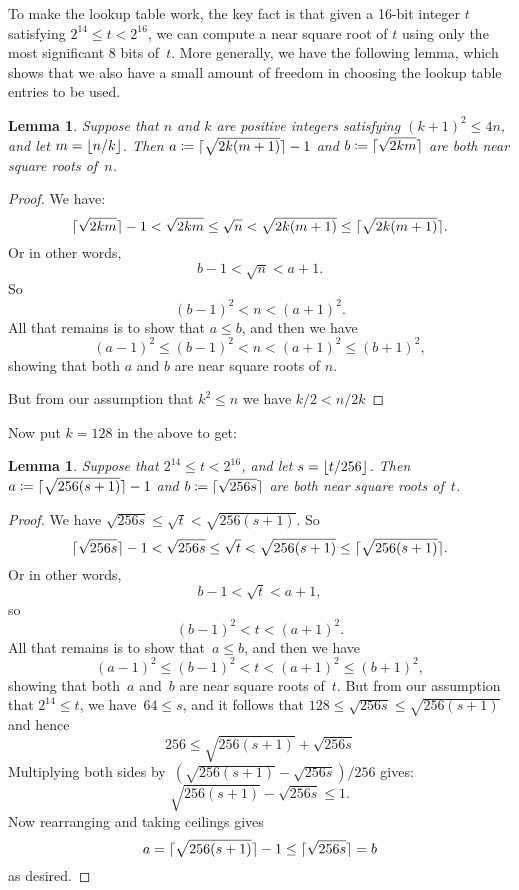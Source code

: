 \documentclass[a4paper]{article}
\DeclarePairedDelimiter\floor{\lfloor}{\rfloor}
\DeclarePairedDelimiter\ceil{\lceil}{\rceil}
\newcommand{\csqrt}[1]{\ceil{\sqrt{#1}}}
\theoremstyle{plain}
\newtheorem{lemma}[theorem]{Lemma}
\theoremstyle{definition}
\begin{document}
To make the lookup table work, the key fact is that given a 16-bit integer $t$
satisfying $2^{14} \le t < 2^{16}$, we can compute a near square root of $t$
using only the most significant 8 bits of~$t$. More generally, we have the
following lemma, which shows that we also have a small amount of freedom in
choosing the lookup table entries to be used.

\begin{lemma} Suppose that $n$ and $k$ are positive integers satisfying
  $(k+1)^2 \le 4n$, and let $m = \floor{n / k}$.
  Then $a \coloneqq \csqrt{2k(m+1)} - 1$ and $b \coloneqq \csqrt{2km}$
  are both near square roots of~$n$.
\end{lemma}

\begin{proof}
  We have:
    $$\csqrt{2km} - 1
      < \sqrt{2km}
      \le \sqrt n
      < \sqrt{2k(m+1)}
      \le \csqrt{2k(m+1)}.$$
  Or in other words,
    $$b - 1 < \sqrt n < a + 1.$$
  So
    $$(b - 1)^2 < n < (a + 1)^2.$$
  All that remains is to show that $a \le b$, and then we have
    $$(a - 1)^2 \le (b - 1)^2 < n < (a + 1)^2 \le (b + 1)^2,$$
  showing that both $a$ and $b$ are near square roots of $n$.

  But from our assumption that $k^2 \le n$ we have $k/2 < n / 2k$

\end{proof}

Now put $k=128$ in the above to get:

\begin{lemma} Suppose that $2^{14} \le t < 2^{16}$, and let $s = \floor{t /
256}$. Then $a \coloneqq \csqrt{256(s+1)} - 1$ and $b \coloneqq \csqrt{256s}$
are both near square roots of~$t$.
\end{lemma}

\begin{proof}
We have $\sqrt{256s} \le \sqrt{t} <
\sqrt{256(s+1)}$. So
$$\csqrt{256s} - 1 < \sqrt{256s} \le \sqrt t < \sqrt{256(s+1)} \le \csqrt{256(s+1)}.$$
Or in other words,
$$b - 1 < \sqrt t < a + 1,$$
so
$$(b - 1)^2 < t < (a + 1)^2.$$
All that remains is to show that~$a\le b$, and then we have
$$(a - 1)^2 \le (b - 1)^2 < t < (a + 1)^2 \le (b + 1)^2,$$ showing that
both~$a$ and~$b$ are near square roots of~$t$. But from our assumption that
$2^{14} \le t$, we have~$64 \le s$, and it follows that $128 \le \sqrt{256s}
\le \sqrt{256(s+1)}$ and hence
$$256 \le \sqrt{256(s+1)} + \sqrt{256s}$$ Multiplying both sides
by~$(\sqrt{256(s+1)} - \sqrt{256s}) / 256$ gives:
$$\sqrt{256(s+1)} - \sqrt{256s} \le 1.$$ Now rearranging and taking ceilings
gives
$$a = \csqrt{256(s+1)} - 1 \le \csqrt{256s} = b$$ as desired.
\end{proof}
\end{document}
